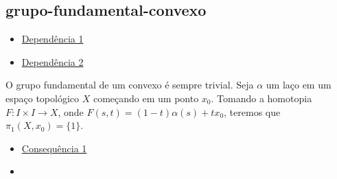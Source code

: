 \subsection{grupo-fundamental-convexo}
\label{grupo-fundamental-convexo}
\begin{itemize}{Lista de dependências}
    \item \hyperref[grupo-fundamental]{Dependência 1}
    \item \hyperref[homotopia]{Dependência 2}
    
\end{itemize}
O grupo fundamental de um convexo é sempre trivial. Seja $\alpha$ um laço em um espaço topológico $X$ começando em um ponto $x_0$.
Tomando a homotopia $F:I \times I \longrightarrow X$, onde $F(s,t) = (1 - t)\alpha(s) + tx_0$, teremos que $\pi_1(X, x_0) = \{1\}$.

\begin{itemize}{lista de consequências}
    \item \hyperref[teo-ponto-fixo-Brower]{Consequência 1}
    \item \hyperref[]{}
\end{itemize}